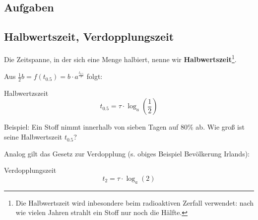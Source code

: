 


\subsection*{Aufgaben}

\newpage

\subsection{Halbwertszeit, Verdopplungszeit}

Die Zeitspanne, in der sich eine Menge halbiert, nenne wir
\textbf{Halbwertszeit}\footnote{Die Halbwertszeit wird inbesondere
  beim radioaktiven Zerfall verwendet: nach wie vielen Jahren strahlt
  ein Stoff nur noch die Hälfte.}.

Aus $\frac12b = f(t_{0.5}) = b\cdot{}a^{\frac{t_{0.5}}{\tau}}$
folgt:

\begin{gesetz}{Halbwertzszeit}{}
  $$t_{0.5} = \tau\cdot{}\log_a\left(\frac12\right)$$
\end{gesetz}

Beispiel: Ein Stoff nimmt innerhalb von sieben Tagen auf 80\% ab. Wie
groß ist seine Halbwertszeit $t_{0.5}$?



Analog gilt das Gesetz zur Verdopplung (s. obiges Beispiel Bevölkerung Irlands):
\begin{gesetz}{Verdopplungszeit}{}
  $$t_2 = \tau\cdot{}\log_a(2)$$
\end{gesetz}

\newpage
